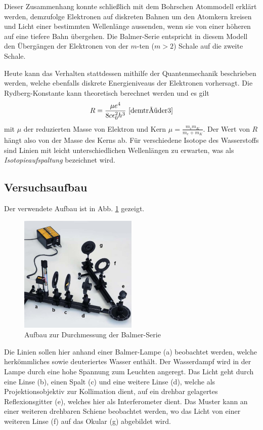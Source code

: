 \documentclass{article}
\begin{document}
Dieser Zusammenhang konnte schließlich mit dem Bohrschen Atommodell erklärt werden, demzufolge Elektronen auf diskreten Bahnen um den Atomkern kreisen
und Licht einer bestimmten Wellenlänge aussenden, wenn sie von einer höheren auf eine tiefere Bahn übergehen.
Die Balmer-Serie entspricht in diesem Modell den Übergängen der Elektronen von der $m$-ten ($m>2$) Schale auf die zweite Schale.

Heute kann das Verhalten stattdessen mithilfe der Quantenmechanik beschrieben werden, welche ebenfalls diskrete Energieniveaus der Elektronen vorhersagt.
Die Rydberg-Konstante kann theoretisch berechnet werden und es gilt
\begin{equation}
  R = \frac{\mu e^4}{8c\epsilon_0^2 h^3}~\cite[S.101]{demtröder3} \label{eq:rydberg-konstante} 
\end{equation}
mit $\mu$ der reduzierten Masse von Elektron und Kern $\mu = \frac{m_e m_K}{m_e+m_K}$.
Der Wert von $R$ hängt also von der Masse des Kerns ab. Für verschiedene Isotope des Wasserstoffs sind Linien mit leicht unterschiedlichen Wellenlängen
zu erwarten, was als \textit{Isotopieaufspaltung} bezeichnet wird.

\subsection{Versuchsaufbau}
Der verwendete Aufbau ist in Abb. \ref{fig:balmer-aufbau} gezeigt.
\begin{figure}[h]
  \centering
  \includegraphics[width=0.5\textwidth]{balmer-aufbau}
  \caption{Aufbau zur Durchmessung der Balmer-Serie \cite{Anleitung}}
  \label{fig:balmer-aufbau}
\end{figure}
Die Linien sollen hier anhand einer Balmer-Lampe (a) beobachtet werden, welche herkömmliches sowie deuteriertes Wasser enthält.
Der Wasserdampf wird in der Lampe durch eine hohe Spannung zum Leuchten angeregt. Das Licht geht durch eine Linse (b), einen Spalt (c) 
und eine weitere Linse (d), welche als Projektionsobjektiv zur Kollimation dient, auf ein drehbar gelagertes Reflexionsgitter (e), welches hier als Interferometer dient. Das Muster kann an einer weiteren
drehbaren Schiene beobachtet werden, wo das Licht von einer weiteren Linse (f) auf das Okular (g) abgebildet wird.
\end{document}

